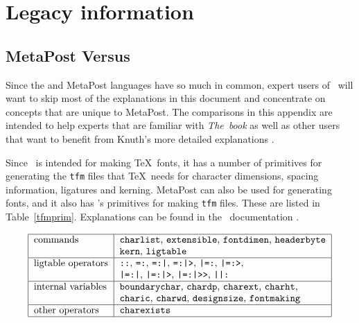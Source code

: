 \section{Legacy information}
\label{legacy}

\subsection{MetaPost Versus \MF}
\label{MPvsMF}

Since the \MF{} and MetaPost languages have so much in
common, expert users of \MF\ will want to skip most of the explanations
in this document and concentrate on concepts that are unique to
MetaPost.  The comparisons in this appendix are intended to help experts
that are familiar with {\sl The\ \MF book} as well as other users that
want to benefit from Knuth's more detailed explanations \cite{kn:c}.

Since \MF\ is intended for making \TeX\ fonts, it has a number of
primitives for generating the {\tt tfm} files that \TeX\ needs for character
dimensions, spacing information, ligatures and
kerning.  MetaPost can also be used for generating fonts,
and it also has \MF's primitives for making {\tt tfm} files.  These are
listed in Table~\ref{tfmprim}.  Explanations can be found in the \MF\
documentation \cite{kn:c,kn:mf3}.

\begin{table}[htp]
$$\begin{tabular}{|l|l|}  \hline
commands&               {\tt charlist}, {\tt extensible},
                        {\tt fontdimen}, {\tt headerbyte}               \\
        &               {\tt kern}, {\tt ligtable}                      \\ \hline
ligtable operators&     \verb!::!, \verb!=:!, \verb!=:|!, \verb!=:|>!,
                        \verb!|=:!, \verb!|=:>!,                        \\
        &               \verb!|=:|!, \verb!|=:|>!, \verb!|=:|>>!,
                        \verb!||:!                                      \\ \hline
internal variables\index{internal variables}\index{variables!internal}&
                        {\tt boundarychar}, {\tt chardp},
                        {\tt charext}, {\tt charht},                    \\
        &               {\tt charic}, {\tt charwd},
                        {\tt designsize}, {\tt fontmaking}              \\ \hline
other operators&        {\tt charexists}                                \\ \hline
\end{tabular}
$$
\caption{MetaPost primitives for making {\tt tfm} files.}
\label{tfmprim}
\end{table}

